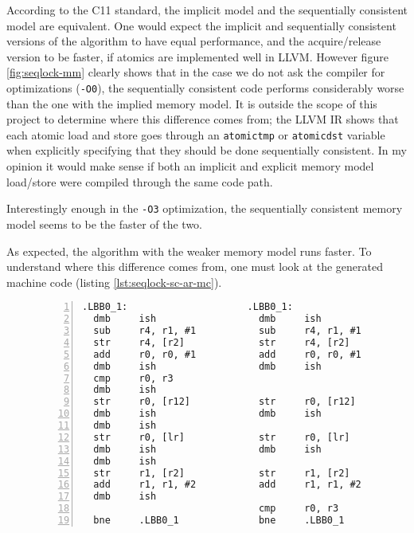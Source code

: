 \documentclass[journal]{IEEEtran}
\begin{document}
According to the C11 standard, the implicit model and the sequentially consistent model are equivalent.
One would expect the implicit and sequentially consistent versions of the algorithm to have equal performance, and the acquire/release version to be faster, if atomics are implemented well in LLVM.
However figure \ref{fig:seqlock-mm} clearly shows that in the case we do not ask the compiler for optimizations (\texttt{-O0}), the sequentially consistent code performs considerably worse than the one with the implied memory model.
It is outside the scope of this project to determine where this difference comes from; the LLVM IR shows that each atomic load and store goes through an \texttt{atomictmp} or \texttt{atomicdst} variable when explicitly specifying that they should be done sequentially consistent.
In my opinion it would make sense if both an implicit and explicit memory model load/store were compiled through the same code path.

Interestingly enough in the \texttt{-O3} optimization, the sequentially consistent memory model seems to be the faster of the two.

As expected, the algorithm with the weaker memory model runs faster.
To understand where this difference comes from, one must look at the generated machine code (listing \ref{lst:seqlock-sc-ar-mc}).
\begin{figure}[h]
    \begin{lstlisting}[caption={Machine code for the loop in the \texttt{writer} function, optimization \texttt{-O3}, left the sequentially consistent version, right the acquire/release},frame=single,xleftmargin=2em,numbers=left,label=lst:seqlock-sc-ar-mc]
.LBB0_1:                     .LBB0_1:                         
  dmb     ish                  dmb     ish
  sub     r4, r1, #1           sub     r4, r1, #1
  str     r4, [r2]             str     r4, [r2]
  add     r0, r0, #1           add     r0, r0, #1
  dmb     ish                  dmb     ish
  cmp     r0, r3      
  dmb     ish        
  str     r0, [r12]            str     r0, [r12]
  dmb     ish                  dmb     ish
  dmb     ish        
  str     r0, [lr]             str     r0, [lr]
  dmb     ish                  dmb     ish
  dmb     ish        
  str     r1, [r2]             str     r1, [r2]
  add     r1, r1, #2           add     r1, r1, #2
  dmb     ish
                               cmp     r0, r3
  bne     .LBB0_1              bne     .LBB0_1
    \end{lstlisting}
\end{figure}
\end{document}
